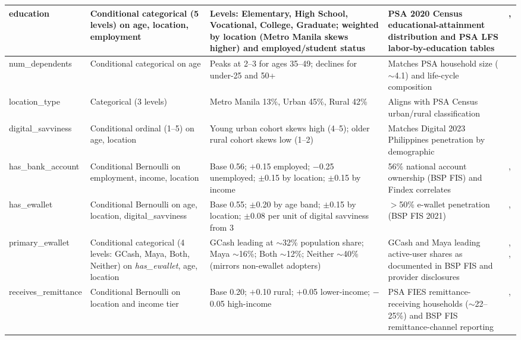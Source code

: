 \documentclass{icsthesis}
\begin{document}
\begin{mainmatter}
{\begin{xltabular}{\textwidth}{|>{\raggedright\arraybackslash}p{0.14\textwidth}|X|X|X|>{\centering\arraybackslash}p{0.12\textwidth}|}
						\hline
						education & Conditional categorical (5 levels) on age, location, employment & Levels: Elementary, High School, Vocational, College, Graduate; weighted by location (Metro Manila skews higher) and employed/student status & PSA 2020 Census educational-attainment distribution and PSA LFS labor-by-education tables & \cite{ref39}, \cite{ref41} \\
						\hline
						num\_\newline dependents & Conditional categorical on age & Peaks at 2--3 for ages 35--49; declines for under-25 and 50+ & Matches PSA household size ($\sim$4.1) and life-cycle composition & \cite{ref39} \\
						\hline
						location\_\newline type & Categorical (3 levels) & Metro Manila 13\%, Urban 45\%, Rural 42\% & Aligns with PSA Census urban/rural classification & \cite{ref39} \\
						\hline
						digital\_\newline savviness & Conditional ordinal (1--5) on age, location & Young urban cohort skews high (4--5); older rural cohort skews low (1--2) & Matches Digital 2023 Philippines penetration by demographic & \cite{ref42} \\
						\hline
						has\_bank\_\newline account & Conditional Bernoulli on employment, income, location & Base 0.56; $+$0.15 employed; $-$0.25 unemployed; $\pm$0.15 by location; $\pm$0.15 by income & 56\% national account ownership (BSP FIS) and Findex correlates & \cite{ref35}, \cite{ref66} \\
						\hline
						has\_ewallet & Conditional Bernoulli on age, location, digital\_savviness & Base 0.55; $\pm$0.20 by age band; $\pm$0.15 by location; $\pm 0.08$ per unit of digital savviness from 3 & $>$50\% e-wallet penetration (BSP FIS 2021) & \cite{ref35}, \cite{ref42} \\
						\hline
						primary\_ewallet & Conditional categorical (4 levels: GCash, Maya, Both, Neither) on \emph{has\_ewallet}, age, location & GCash leading at $\sim$32\% population share; Maya $\sim$16\%; Both $\sim$12\%; Neither $\sim$40\% (mirrors non-ewallet adopters) & GCash and Maya leading active-user shares as documented in BSP FIS and provider disclosures & \cite{ref9}, \cite{ref35}, \cite{ref42} \\
						\hline
						receives\_remittance & Conditional Bernoulli on location and income tier & Base 0.20; $+$0.10 rural; $+$0.05 lower-income; $-$0.05 high-income & PSA FIES remittance-receiving households ($\sim$22--25\%) and BSP FIS remittance-channel reporting & \cite{ref35}, \cite{ref40} \\

\end{xltabular}}
\end{mainmatter}
\end{document}
